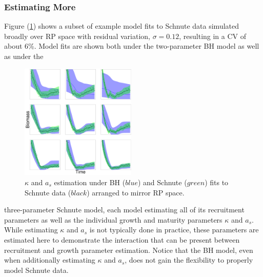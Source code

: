 %
\subsubsection{Estimating More\label{estMore}}

%
Figure (\ref{estAK}) shows a subset of example model fits to Schnute data 
simulated broadly over RP space with residual variation, $\sigma=0.12$, 
resulting in a CV of about 6\%.
Model fits are shown both under the two-parameter BH model as well as under the
\begin{figure}
\includegraphics[width=0.49\textwidth]{../ddBias/indexGridKAExpT45N300A0-1AS10K0.1.png}
\caption{
$\kappa$ and $a_s$ estimation under BH ($blue$) and Schnute ($green$) fits to
Schnute data ($black$) arranged to mirror RP space. %
}\label{estAK}
\end{figure}
three-parameter Schnute model, each model estimating all of its recruitment
parameters as 
well as the individual growth and maturity parameters $\kappa$ and $a_s$.
While estimating $\kappa$ and $a_s$ is not typically done in practice, these 
parameters are estimated here to demonstrate the interaction that can be present 
between recruitment and growth parameter estimation. Notice that the BH model, even 
when additionally estimating $\kappa$ and $a_s$, does not gain the flexibility 
to properly model Schnute data.

